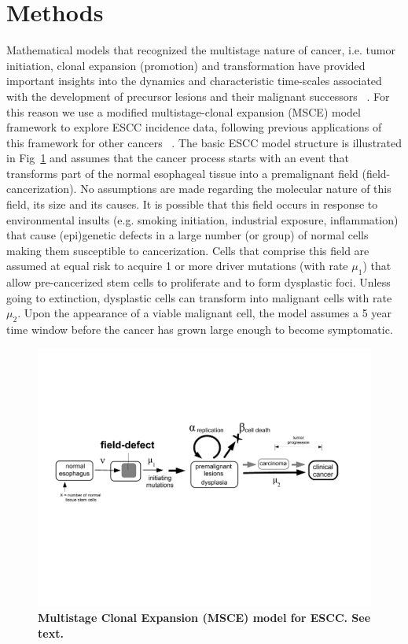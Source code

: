 \documentclass[10pt,letterpaper]{article}
\begin{document}
\section*{Methods}
Mathematical models that recognized the multistage nature of cancer, i.e. tumor initiation, clonal expansion (promotion) and transformation have provided important insights into the dynamics and characteristic time-scales associated with the development of precursor lesions and their malignant successors ~\cite{Moolgavkar1990, Luebeck2002, Luebeck2013, Meza2008}. For this reason we use a modified multistage-clonal expansion (MSCE) model framework to explore ESCC incidence data, following previous applications of this framework for other cancers ~\cite{Luebeck1999, Hazelton2001, Jeon2006, Jeon2008, Meza2010, Curtius2015, Luebeck2019}. The basic ESCC model structure is illustrated in Fig~\ref{fig1} and assumes that the cancer process starts with an event that transforms part of the normal esophageal tissue into a premalignant field (field-cancerization). No assumptions are made regarding the molecular nature of this field, its size and its causes. It is possible that this field occurs in response to environmental insults (e.g. smoking initiation, industrial exposure, inflammation) that cause (epi)genetic defects in a large number (or group) of normal cells making them susceptible to cancerization. Cells that comprise this field are assumed at equal risk to acquire 1 or more driver mutations (with rate $\mu_1$) that allow pre-cancerized stem cells to proliferate and to form dysplastic foci. Unless going to extinction, dysplastic cells can transform into malignant cells with rate $\mu_2$.  Upon the appearance of a viable malignant cell, the model assumes a 5 year time window before the cancer has grown large enough to become symptomatic.

\medskip
\begin{figure}[!ht]
\begin{adjustwidth}{-1.in}{0in} %
\includegraphics[scale=0.6, trim=0 0 0 0]{FEFF-model-2.pdf}
\caption{{\bf Multistage Clonal Expansion (MSCE) model for ESCC. See text.}}
\label{fig1}
\end{adjustwidth}
\end{figure}
\end{document}
